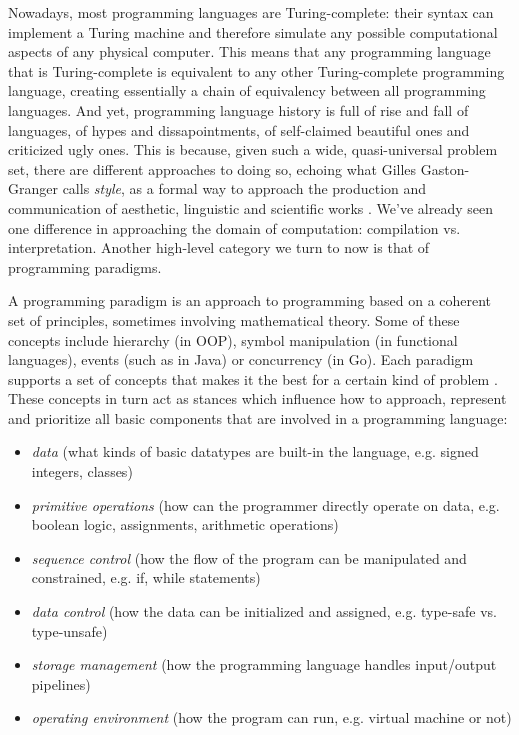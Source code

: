 Nowadays, most programming languages are Turing-complete: their syntax can implement a Turing machine and therefore simulate any possible computational aspects of any physical computer. This means that any programming language that is Turing-complete is equivalent to any other Turing-complete programming language, creating essentially a chain of equivalency between all programming languages. And yet, programming language history is full of rise and fall of languages, of hypes and dissapointments, of self-claimed beautiful ones and criticized ugly ones. This is because, given such a wide, quasi-universal problem set, there are different approaches to doing so, echoing what Gilles Gaston-Granger calls \emph{style}, as a formal way to approach the production and communication of aesthetic, linguistic and scientific works \citep{granger_essai_1988}. We've already seen one difference in approaching the domain of computation: compilation vs. interpretation. Another high-level category we turn to now is that of programming paradigms.

A programming paradigm is an approach to programming based on a coherent set of principles, sometimes involving mathematical theory. Some of these concepts include hierarchy (in OOP), symbol manipulation (in functional languages), events (such as in Java) or concurrency (in Go). Each paradigm supports a set of concepts that makes it the best for a certain kind of problem \citep{vanroy_programming_2012}. These concepts in turn act as stances which influence how to approach, represent and prioritize all basic components that are involved in a programming language:

\begin{itemize}
  \item{\emph{data} (what kinds of basic datatypes are built-in the language, e.g. signed integers, classes)}
  \item{\emph{primitive operations} (how can the programmer directly operate on data, e.g. boolean logic, assignments, arithmetic operations)}
  \item{\emph{sequence control} (how the flow of the program can be manipulated and constrained, e.g. if, while statements)}
  \item{\emph{data control} (how the data can be initialized and assigned, e.g. type-safe vs. type-unsafe)}
  \item{\emph{storage management} (how the programming language handles input/output pipelines)}
  \item{\emph{operating environment} (how the program can run, e.g. virtual machine or not)}
\end{itemize}

